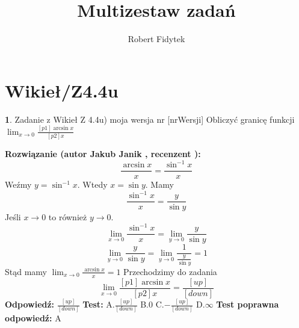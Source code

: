 \documentclass[12pt, a4paper]{article}
\title{Multizestaw zadań}
\author{Robert Fidytek}
\date{}
\theoremstyle{definition} %
\newtheorem{zad}{}
\newcommand{\kategoria}[1]{\section{#1}} %
\newcommand{\zadStart}[1]{\begin{zad}#1\newline} %
\newcommand{\zadStop}{\end{zad}}   %
\newcommand{\rozwStart}[2]{\noindent \textbf{Rozwiązanie (autor #1 , recenzent #2): }\newline} %
\newcommand{\rozwStop}{\newline}                                            %
\newcommand{\odpStart}{\noindent \textbf{Odpowiedź:}\newline}    %
\newcommand{\odpStop}{\newline}                                             %
\newcommand{\testStart}{\noindent \textbf{Test:}\newline} %
\newcommand{\testStop}{\newline} %
\newcommand{\kluczStart}{\noindent \textbf{Test poprawna odpowiedź:}\newline} %
\newcommand{\kluczStop}{\newline} %
\begin{document}
\maketitle


\kategoria{Wikieł/Z4.4u}
\zadStart{Zadanie z Wikieł Z 4.4u) moja wersja nr [nrWersji]}
Obliczyć granicę funkcji $\lim_{x \to 0} \frac{[p1]\arcsin{x}}{[p2]x}$
\zadStop
\rozwStart{Jakub Janik}{}
$$\frac{\arcsin{x}}{x}=\frac{\sin^{-1}{x}}{x}$$
Weźmy $y=\sin^{-1}{x}$. Wtedy $x=\sin{y}$. Mamy
$$\frac{\sin^{-1}{x}}{x}=\frac{y}{\sin{y}}$$
Jeśli $x \to 0$ to również $y \to 0$.
$$\lim_{x \to 0}\frac{\sin^{-1}{x}}{x}=\lim_{y \to 0}\frac{y}{\sin{y}}$$
$$\lim_{y \to 0}\frac{y}{\sin{y}}=\lim_{y \to 0}\frac{1}{\frac{y}{\sin{y}}}=1$$
Stąd mamy $\lim_{x \to 0}\frac{\arcsin{x}}{x}=1$
Przechodzimy do zadania
$$\lim_{x \to 0} \frac{[p1]\arcsin{x}}{[p2]x}=\frac{[up]}{[down]}$$
\rozwStop
\odpStart
$\frac{[up]}{[down]}$
\odpStop
\testStart
A.$\frac{[up]}{[down]}$
B.$0$
C.$-\frac{[up]}{[down]}$
D.$\infty$
\testStop
\kluczStart
A
\kluczStop
\end{document}
